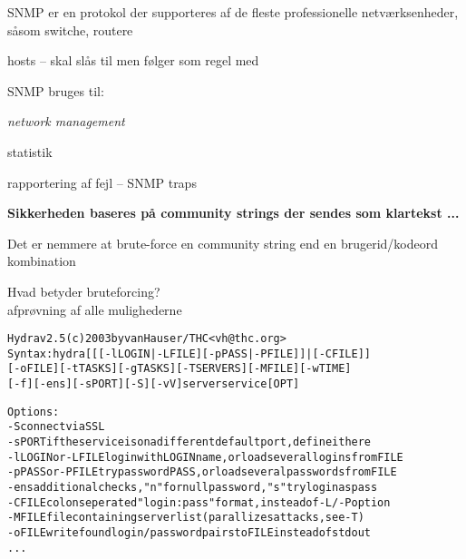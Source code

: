 \documentclass[20pt,landscape,a4paper,footrule]{foils}
\begin{document}

\begin{list1}
\item SNMP er en protokol der supporteres af de fleste professionelle
  netværksenheder, såsom switche, routere
\item hosts -- skal slås til men følger som regel med
\item SNMP bruges til:
  \begin{list2}
    \item \emph{network management}
    \item statistik
    \item rapportering af fejl -- SNMP traps
  \end{list2}
\item {\bfseries Sikkerheden baseres på community strings der sendes
    som klartekst ...}
\item Det er nemmere at brute-force en community string end en
  brugerid/kodeord kombination
\end{list1}


\begin{list1}
\item Hvad betyder bruteforcing?\\
afprøvning af alle mulighederne
\end{list1}

\begin{alltt}
\small
Hydra v2.5 (c) 2003 by van Hauser / THC <vh@thc.org>
Syntax: hydra [[[-l LOGIN|-L FILE] [-p PASS|-P FILE]] | [-C FILE]]
[-o FILE] [-t TASKS] [-g TASKS] [-T SERVERS] [-M FILE] [-w TIME]
[-f] [-e ns] [-s PORT] [-S] [-vV] server service [OPT]

Options:
  -S        connect via SSL
  -s PORT   if the service is on a different default port, define it here
  -l LOGIN  or -L FILE login with LOGIN name, or load several logins from FILE
  -p PASS   or -P FILE try password PASS, or load several passwords from FILE
  -e ns     additional checks, "n" for null password, "s" try login as pass
  -C FILE   colon seperated "login:pass" format, instead of -L/-P option
  -M FILE   file containing server list (parallizes attacks, see -T)
  -o FILE   write found login/password pairs to FILE instead of stdout
...
\end{alltt}


\end{document}
